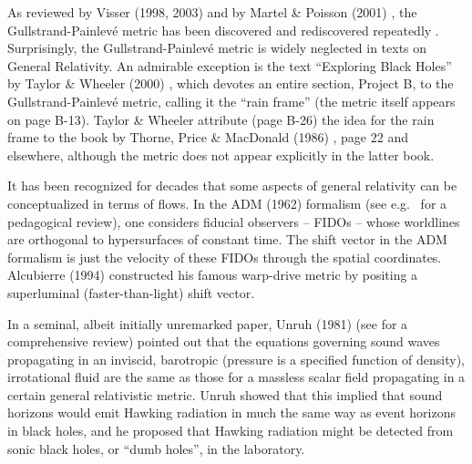 \documentclass[twocolumn,showpacs,preprintnumbers,amsmath,amssymb,prb]{revtex4}
\begin{document}
As reviewed by Visser (1998, 2003) \cite{Visser98, Visser03}
and by Martel \& Poisson (2001) \cite{Martel},
the Gullstrand-Painlev\'e metric has been discovered and rediscovered repeatedly
\cite{Laschkarew26,Lemaitre33,Trautman66,Robertson68,EWCDST73,GH78,Gautreau95,Kraus94,Lake94,LDG98,NST99,Czerniawski02}.
Surprisingly,
the Gullstrand-Painlev\'e metric
is
widely neglected in texts on General Relativity.
An admirable exception is the
text ``Exploring Black Holes''
by Taylor \& Wheeler (2000) \cite{Taylor},
which devotes an entire section, Project B,
to the Gullstrand-Painlev\'e metric,
calling it the ``rain frame''
(the metric itself appears on page B-13).
Taylor \& Wheeler
attribute (page B-26)
the idea for the rain frame to
the book by Thorne, Price \& MacDonald (1986)
\cite{TPM86}, page 22 and elsewhere,
although the metric does not appear explicitly in the latter book.

It has been recognized for decades that
some aspects of general relativity can be conceptualized
in terms of flows.
In the
ADM (1962) formalism \cite{ADM62}
(see e.g.\ \cite{Lehner01} for a pedagogical review),
one considers fiducial observers -- FIDOs\cite{TPM86} --
whose worldlines are orthogonal to hypersurfaces of constant time.
The shift vector in the ADM formalism
is just the velocity of these FIDOs through the spatial coordinates.
Alcubierre (1994) \cite{Alcubierre94} constructed his
famous warp-drive metric by positing a superluminal
(faster-than-light) shift vector.

In a seminal, albeit initially unremarked paper,
Unruh (1981) \cite{Unruh81}
(see \cite{BLV05} for a comprehensive review)
pointed out that
the equations governing sound waves propagating in an inviscid,
barotropic (pressure is a specified function of density), irrotational fluid
are the same as those for a massless scalar field
propagating in a certain general relativistic metric.
Unruh showed that this implied that sound horizons
would emit Hawking radiation in much the same way as event horizons
in black holes,
and he proposed that Hawking radiation might be detected from
sonic black holes, or ``dumb holes'', in the laboratory.
\end{document}
